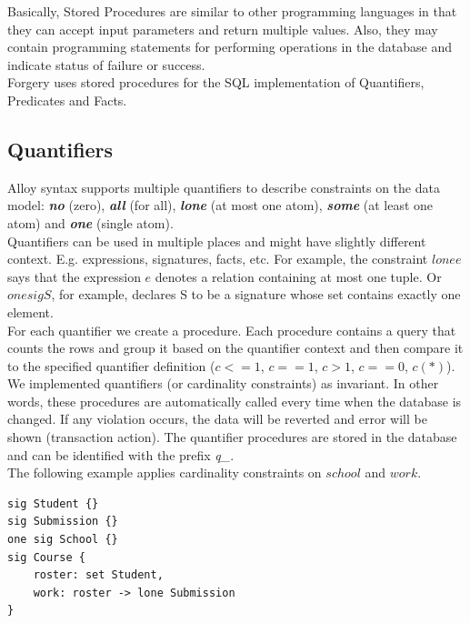 \documentclass[oneside]{book}
\begin{document}
\noindent Basically, Stored Procedures are similar to other programming languages in that they can accept input parameters and return multiple values. Also, they may contain programming statements for performing operations in the database and indicate status of failure or success.\\

\noindent Forgery uses stored procedures for the SQL implementation of Quantifiers, Predicates and Facts.

\subsection{Quantifiers}
\noindent Alloy syntax supports multiple quantifiers to describe constraints on the data model: \textbf{\textit{no}} (zero), \textbf{\textit{all}} (for all), \textbf{\textit{lone}} (at most one atom), \textbf{\textit{some}} (at least one atom) and \textbf{\textit{one}} (single atom).\\

Quantifiers can be used in multiple places and might have slightly different context. E.g. expressions, signatures, facts, etc.
For example, the constraint $lone e$ says that the expression $e$ denotes a relation containing at most one tuple. Or $one sig S$, for example, declares S to be a signature whose set contains exactly one element.\\

For each quantifier we create a procedure. Each procedure contains a query that counts the rows and group it based on the quantifier context and then compare it to the specified quantifier definition ($c<=1$, $c==1$, $c>1$, $c==0$, $c(*)$).\\

We implemented quantifiers (or cardinality constraints) as invariant. In other words, these procedures are automatically called every time when the database is changed. If any violation occurs, the data will be reverted and error will be shown (transaction action). The quantifier procedures are stored in the database and can be identified with the prefix \textit{q\_}.\\

The following example applies cardinality constraints on $school$ and $work$.

\begin{lstlisting}
sig Student {}
sig Submission {}
one sig School {}
sig Course {
	roster: set Student,
	work: roster -> lone Submission
}
\end{lstlisting}
\end{document}
